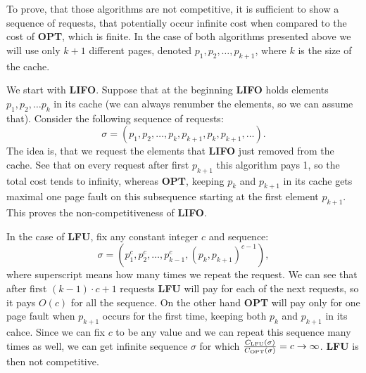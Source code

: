 To prove, that those algorithms are not competitive, it is sufficient to show a sequence 
of requests, that potentially occur infinite cost when compared to the cost of 
\textbf{OPT}, which is finite. In the case of both algorithms presented above we 
will use only 
$k+1$ different pages, denoted $p_1, p_2, \ldots, p_{k+1}$, where $k$ is the 
size of the cache.

We start with \textbf{LIFO}. Suppose that at the beginning \textbf{LIFO} holds
elements $p_1, p_2, \ldots p_k$ in its cache (we can always renumber the 
elements, so we can 
assume that). Consider the following sequence of requests:
$$ \sigma = (p_1, p_2, \ldots, p_k, p_{k+1}, p_k, p_{k+1}, \ldots).$$
The idea is, that we request the elements that \textbf{LIFO} just removed from the 
cache. See that on every request after first $p_{k+1}$ this algorithm pays 1, 
so the total cost tends to infinity, whereas \textbf{OPT}, keeping $p_k$ 
and $p_{k+1}$ in its cache gets maximal one page fault on this subsequence starting at the first element $p_{k+1}$. 
This proves the non-competitiveness of \textbf{LIFO}.

In the case of \textbf{LFU}, fix any constant integer $c$ and sequence:
$$\sigma = (p_1^c, p_2^c, \ldots, p_{k-1}^c, (p_k, p_{k+1})^{c-1}),$$
where superscript means how many times we repeat the request. We can see that 
after first $(k-1) \cdot c + 1$ requests \textbf{LFU} will pay for each of the 
next requests, so it pays $O(c)$ for all the sequence. On the other hand 
\textbf{OPT} will pay only for one page fault when $p_{k+1}$ occurs for the 
first time, keeping both $p_k$ and $p_{k+1}$ in its cahce. Since we can fix $c$ to be any value and we can repeat this 
sequence many times as well, we can get infinite sequence $\sigma$ for which 
$\frac{C_{\mathrm{LFU}}(\sigma)}{C_{\mathrm{OPT}}(\sigma)} = c \rightarrow \infty$. 
\textbf{LFU} is then not competitive.
